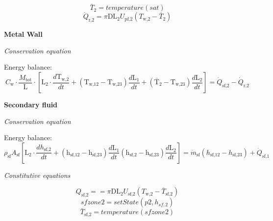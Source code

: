 \documentclass[11pt]{article} %
\begin{document}
\begin{equation}
\bar{T}_\text{2} = temperature(sat)
\end{equation}
\begin{equation}
\dot{Q}_\text{r,2} = \pi \text{D} \text{L}_\text{2} U_\text{pf,2} (T_\text{w,2} - \bar{T}_\text{2})
\end{equation}


\begin{flushleft}
{\bf Metal Wall}\\
\end{flushleft}
\begin{center}
\textit{Conservation equation}
\end{center}
Energy balance:\\
\begin{equation}
C_\text{w} \cdot \frac{M_\text{tot}}{\text{L}} \cdot [\text{L}_\text{2} \cdot  \frac{d \text{T}_\text{w,2}}{d t} +  (\text{T}_\text{w,12} - \text{T}_\text{w,23})  \frac{d \text{L}_\text{1}}{d t} +  (\bar{\text{T}}_\text{2} - \text{T}_\text{w,23})  \frac{d \text{L}_\text{2}}{d t}] = \dot{Q}_\text{sf,2} - \dot{Q}_\text{r,2}
\end{equation}

\begin{flushleft}
{\bf Secondary fluid}\\
\end{flushleft}
\begin{center}
\textit{Conservation equation}
\end{center}
Energy balance:
\begin{equation}
\rho_\text{sf} A_\text{sf} [\text{L}_\text{2} \cdot  \frac{d h_\text{sf,2}}{d t} +  (\text{h}_\text{sf,12} - \text{h}_\text{sf,23})  \frac{d \text{L}_\text{1}}{d t} (\text{h}_\text{sf,2} - \text{h}_\text{sf,23})  \frac{d \text{L}_\text{2}}{d t}] = \dot{m}_\text{sf} ({h}_\text{sf,12} - h_\text{sf,23} ) + \dot{Q}_\text{sf,1} 
\end{equation}
\begin{center}
\textit{Constitutive equations}
\end{center}

\begin{equation}
{Q}_\text{sf,2} = = \pi \text{D} \text{L}_\text{2} U_\text{sf,2} (T_\text{w,2} - \bar{T}_\text{sf,2})
\end{equation}
\begin{equation}
sfzone2 = setState(p2,h_{sf,2})
\end{equation}
\begin{equation}
\bar{T}_\text{sf,2} = temperature(sfzone2)
\end{equation}\\
\end{document}
